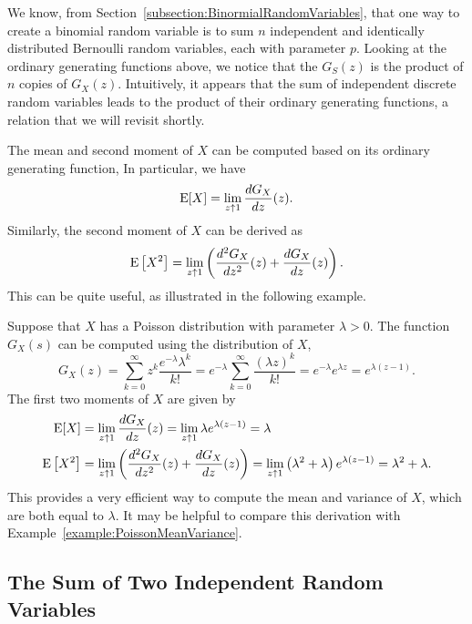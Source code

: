 We know, from Section~\ref{subsection:BinormialRandomVariables}, that one way to create a binomial random variable is to sum $n$ independent and identically distributed Bernoulli random variables, each with parameter $p$.
Looking at the ordinary generating functions above, we notice that the $G_S(z)$ is the product of $n$ copies of $G_X(z)$.
Intuitively, it appears that the sum of independent discrete random variables leads to the product of their ordinary generating functions, a relation that we will revisit shortly.

The mean and second moment of $X$ can be computed based on its ordinary generating function,
In particular, we have
\begin{equation*}
\mathrm{E} [X] = \lim_{z \uparrow 1} \frac{d G_X}{dz}(z) .
\end{equation*}
Similarly, the second moment of $X$ can be derived as
\begin{equation*}
\mathrm{E} \left[ X^2 \right]
= \lim_{z \uparrow 1} \left( \frac{d^2 G_X}{dz^2}(z) + \frac{d G_X}{dz}(z) \right) .
\end{equation*}
This can be quite useful, as illustrated in the following example.

\begin{example}
Suppose that $X$ has a Poisson distribution with parameter $\lambda > 0$.
The function $G_X(s)$ can be computed using the distribution of $X$,
\begin{equation*}
G_X(z) = \sum_{k = 0}^\infty z^{k} \frac{e^{-\lambda}\lambda^k}{k!}
= e^{-\lambda} \sum_{k = 0}^\infty \frac{(\lambda z)^k}{k!}
= e^{-\lambda} e^{\lambda z} = e^{\lambda(z - 1)} .
\end{equation*}
The first two moments of $X$ are given by
\begin{align*}
\mathrm{E} [X] &= \lim_{z \uparrow 1} \frac{d G_X}{dz} (z)
= \lim_{z \uparrow 1} \lambda e^{\lambda(z - 1)} = \lambda \\
\mathrm{E} \left[ X^2 \right] &= \lim_{z \uparrow 1}
\left( \frac{d^2 G_X}{dz^2} (z) + \frac{d G_X}{dz} (z) \right)
= \lim_{z \uparrow 1} \left( \lambda^2 + \lambda \right)
e^{\lambda (z - 1)} = \lambda^2 + \lambda .
\end{align*}
This provides a very efficient way to compute the mean and variance of $X$, which are both equal to $\lambda$.
It may be helpful to compare this derivation with Example~\ref{example:PoissonMeanVariance}.
\end{example}

\subsection{The Sum of Two Independent Random Variables}

